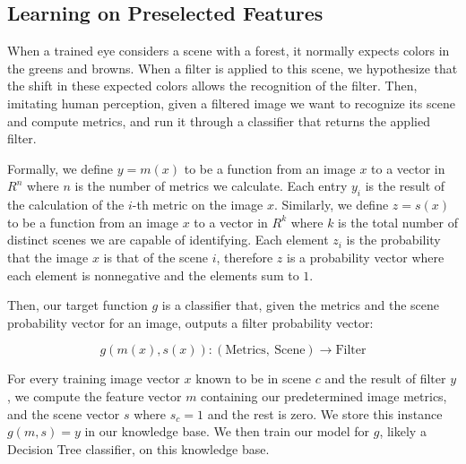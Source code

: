 \documentclass[a4paper, 11pt]{article}
\DeclareMathOperator{\dist}{dist}
\begin{document}
\subsection*{Learning on Preselected Features}
When a trained eye considers a scene with a forest, it normally expects colors in the greens and browns. When a filter is applied to this scene, we hypothesize that the shift in these expected colors allows the recognition of the filter. Then, imitating human perception, given a filtered image we want to recognize its scene and compute metrics, and run it through a classifier that returns the applied filter.

Formally, we define $y = m(x)$ to be a function from an image $x$ to a vector in $R^n$ where $n$ is the number of metrics we calculate. Each entry $y_i$ is the result of the calculation of the $i$-th metric on the image $x$. Similarly, we define $z = s(x)$ to be a function from an image $x$ to a vector in $R^k$ where $k$ is the total number of distinct scenes we are capable of identifying. Each element $z_i$ is the probability that the image $x$ is that of the scene $i$, therefore $z$ is a probability vector where each element is nonnegative and the elements sum to $1$.

Then, our target function $g$ is a classifier that, given the metrics and the scene probability vector for an image, outputs a filter probability vector:

$$g(m(x), s(x)) : (\text{Metrics},\ \text{Scene}) \to \text{Filter}$$



For every training image vector $x$ known to be in scene $c$ and the result of filter $y$, we compute the feature vector $m$ containing our predetermined image metrics, and the scene vector $s$ where $s_c = 1$ and the rest is zero. We store this instance $g(m, s) = y$ in our knowledge base. We then train our model for $g$, likely a Decision Tree classifier, on this knowledge base.
\end{document}

